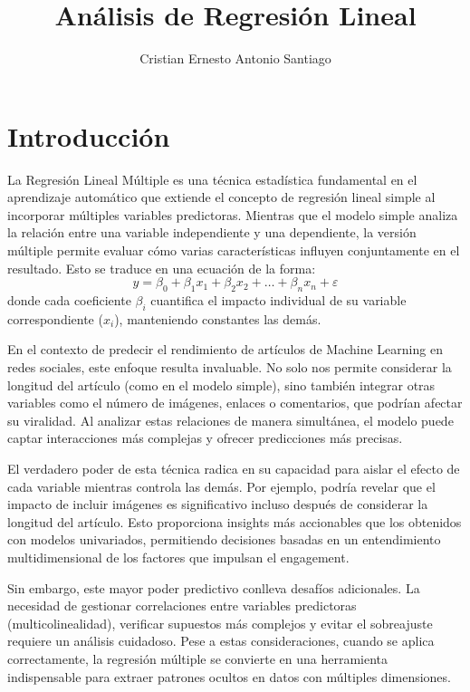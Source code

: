 \documentclass[12pt, a4paper]{article}
\title{Análisis de Regresión Lineal}
\author{Cristian Ernesto Antonio Santiago}
\date{}
\begin{document}
\maketitle

\section{Introducción}
La Regresión Lineal Múltiple es una técnica estadística fundamental en el aprendizaje automático que extiende el concepto de regresión lineal simple al incorporar múltiples variables predictoras. Mientras que el modelo simple analiza la relación entre una variable independiente y una dependiente, la versión múltiple permite evaluar cómo varias características influyen conjuntamente en el resultado. Esto se traduce en una ecuación de la forma:
\[ y = \beta_0 + \beta_1x_1 + \beta_2x_2 + \dots + \beta_nx_n + \varepsilon \]
donde cada coeficiente $\beta_i$ cuantifica el impacto individual de su variable correspondiente ($x_i$), manteniendo constantes las demás.

En el contexto de predecir el rendimiento de artículos de Machine Learning en redes sociales, este enfoque resulta invaluable. No solo nos permite considerar la longitud del artículo (como en el modelo simple), sino también integrar otras variables como el número de imágenes, enlaces o comentarios, que podrían afectar su viralidad. Al analizar estas relaciones de manera simultánea, el modelo puede captar interacciones más complejas y ofrecer predicciones más precisas.

El verdadero poder de esta técnica radica en su capacidad para aislar el efecto de cada variable mientras controla las demás. Por ejemplo, podría revelar que el impacto de incluir imágenes es significativo incluso después de considerar la longitud del artículo. Esto proporciona insights más accionables que los obtenidos con modelos univariados, permitiendo decisiones basadas en un entendimiento multidimensional de los factores que impulsan el engagement.

Sin embargo, este mayor poder predictivo conlleva desafíos adicionales. La necesidad de gestionar correlaciones entre variables predictoras (multicolinealidad), verificar supuestos más complejos y evitar el sobreajuste requiere un análisis cuidadoso. Pese a estas consideraciones, cuando se aplica correctamente, la regresión múltiple se convierte en una herramienta indispensable para extraer patrones ocultos en datos con múltiples dimensiones.
\end{document}
